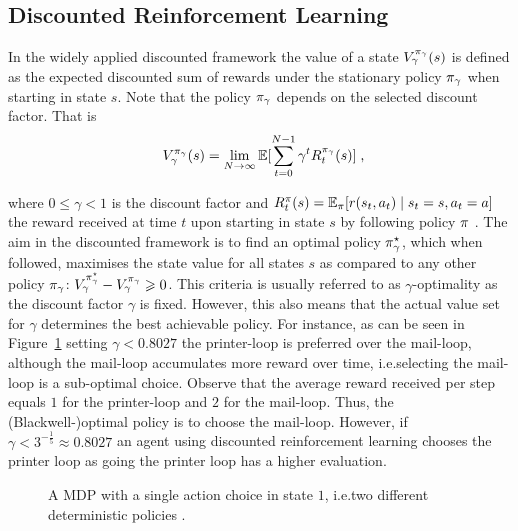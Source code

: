 \documentclass[envcountsame]{llncs}
\begin{document}
\subsection{Discounted Reinforcement Learning}
\label{subsec:Discounted_Reinforcement_Learning}


In the widely applied discounted framework the value of a state \(V_{\gamma}^{\pi_{\gamma}}(s)\) is
defined as the expected discounted sum of rewards under the stationary policy \(\pi_{\gamma}\) when
starting in state \(s\). Note that the policy \(\pi_{\gamma}\) depends on the selected discount
factor. That is
\begin{align*}
  V_{\gamma}^{\pol_{\gamma}}(s)=\lim_{N \to \infty} \E[\sum_{t=0}^{N-1} \gamma^{t} R_{t}^{\pol_{\gamma}}(s)]\tcom
\end{align*}

where \(0 \leqslant \gamma < 1\) is the discount factor and
\(R_{t}^{\pi}(s) = \operatorname*{\mathbb{E}}_{\pi}[ r(s_{t},a_{t}) \mid s_{t} = s, a_{t} = a]\) the reward received at
time \(t\) upon starting in state \(s\) by following policy \(\pi\)
\citep{Mahadevan96_AverageRewardReinforcementLearningFoundationsAlgorithmsAndEmpiricalResults}.
%
The aim in the discounted framework is to find an optimal policy \(\pi^{\star}_{\gamma}\), which when
followed, maximises the state value for all states \(s\) as compared to any other policy
\(\pi_{\gamma}\): \(V_{\gamma}^{\pi^{\star}_{\gamma}} - V_{\gamma}^{\pi_{\gamma}} \geqslant 0\). This
criteria is usually referred to as \(\gamma\)-optimality as the discount factor \(\gamma\) is fixed.
However, this also means that the actual value set for \(\gamma\) determines the best achievable
policy. For instance, as can be seen in Figure~\ref{fig:printer} setting \(\gamma <0.8027\) the
printer-loop is preferred over the mail-loop, although the mail-loop accumulates more
reward over time, i.e.\@ selecting the mail-loop is a sub-optimal choice. Observe that the average
reward received per step equals \(1\) for the printer-loop and \(2\) for the mail-loop. Thus, the
(Blackwell-)optimal policy is to choose the mail-loop. However, if
\(\gamma < 3^{-\frac{1}{5}} \approx 0.8027\) an agent using discounted reinforcement learning
chooses the printer loop as going the printer loop has a higher evaluation.
%
\begin{figure}[t!]
  \centering
  
  \caption{\label{fig:printer} A MDP with a single action choice in
    state \(1\), i.e.\@ two different deterministic policies
    \citep[][adapted]{Mahadevan96_OptimalityCriteriaInReinforcementLearning}.
  }
\end{figure}
%
\end{document}

